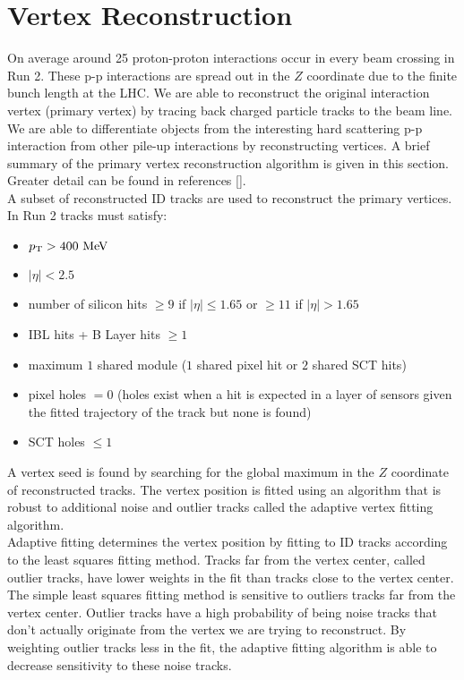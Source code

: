 \section{Vertex Reconstruction}
\label{sec:reco:vtx}

\indent On average around 25 proton-proton interactions occur in every beam crossing in Run 2.  These p-p interactions are spread out in the $Z$ coordinate due to the finite bunch length at the LHC.  We are able to reconstruct the original interaction vertex (primary vertex) by tracing back charged particle tracks to the beam line.  We are able to differentiate objects from the interesting hard scattering p-p interaction from other pile-up interactions by reconstructing vertices.  A brief summary of the primary vertex reconstruction algorithm is given in this section.  Greater detail can be found in references [\cite{VertexReco,adaptiveFitting}]. \\

\indent A subset of reconstructed ID tracks are used to reconstruct the primary vertices.  In Run 2 tracks must satisfy:

\begin{itemize}
\item[] $\pt > 400 \mev$
\item[] $|\eta| < 2.5$
\item[] number of silicon hits $ \ge 9$ if $|\eta| \le 1.65$ or $\ge 11$ if $|\eta| > 1.65$
\item[] IBL hits + B Layer hits $\ge 1$
\item[] maximum $1$ shared module ($1$ shared pixel hit or $2$ shared SCT hits)
\item[] pixel holes $= 0$ (holes exist when a hit is expected in a layer of sensors given the fitted trajectory of the track but none is found)
\item[] SCT holes $\le 1$
\end{itemize}

\indent A vertex seed is found by searching for the global maximum in the $Z$ coordinate of reconstructed tracks.  The vertex position is fitted using an algorithm that is robust to additional noise and outlier tracks called the adaptive vertex fitting algorithm. \cite{VertexReco,adaptiveFitting}  \\

\indent Adaptive fitting determines the vertex position by fitting to ID tracks according to the least squares fitting method.  Tracks far from the vertex center, called outlier tracks, have lower weights in the fit than tracks close to the vertex center.  The simple least squares fitting method is sensitive to outliers tracks far from the vertex center.  Outlier tracks have a high probability of being noise tracks that don't actually originate from the vertex we are trying to reconstruct.  By weighting outlier tracks less in the fit, the adaptive fitting algorithm is able to decrease sensitivity to these noise tracks.  \\

